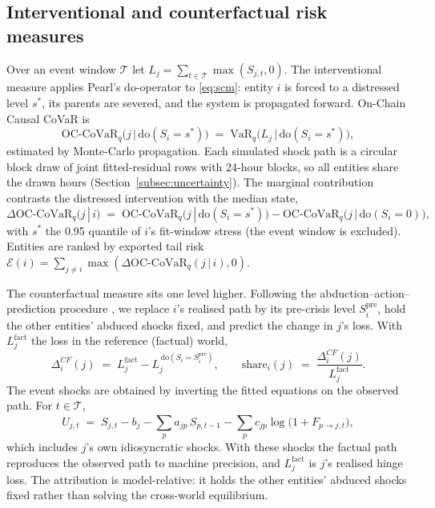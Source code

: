 \documentclass[referee,pdflatex,sn-mathphys-ay]{sn-jnl}
\theoremstyle{thmstyleone}%
\theoremstyle{thmstyletwo}%
\theoremstyle{thmstylethree}%
\newcommand{\doop}{\mathrm{do}}
\newcommand{\VaR}{\mathrm{VaR}}
\newcommand{\OCCoVaR}{\text{OC-CoVaR}}
\begin{document}
\subsection{Interventional and counterfactual risk measures}
\label{subsec:risk}
Over an event window $\mathcal{T}$ let $L_j=\sum_{t\in\mathcal{T}}\max(S_{j,t},0)$. The
interventional measure applies Pearl's do-operator to \eqref{eq:scm}: entity $i$ is forced
to a distressed level $s^\ast$, its parents are severed, and the system is propagated
forward. On-Chain Causal CoVaR is
\begin{equation}
\label{eq:occovar}
\OCCoVaR_q\big(j \,\big|\, \doop(S_i=s^\ast)\big)
   \;=\; \VaR_q\!\Big(L_j \,\Big|\, \doop(S_i=s^\ast)\Big),
\end{equation}
estimated by Monte-Carlo propagation. Each simulated shock path is a circular block draw of joint fitted-residual rows
with 24-hour blocks, so all entities share the drawn hours (Section~\ref{subsec:uncertainty}). The marginal
contribution contrasts the distressed intervention with the median state,
\begin{equation}
\label{eq:deltaoccovar}
\Delta\OCCoVaR_q(j\,|\,i) \;=\;
\OCCoVaR_q\big(j\,|\,\doop(S_i=s^\ast)\big) -
\OCCoVaR_q\big(j\,|\,\doop(S_i=0)\big),
\end{equation}
with $s^\ast$ the 0.95 quantile of $i$'s fit-window stress (the event window is excluded).
Entities are ranked by exported tail
risk $\mathcal{E}(i)=\sum_{j\ne i}\max(\Delta\OCCoVaR_q(j\,|\,i),0)$.

The counterfactual measure sits one level higher. Following the abduction--action--prediction
procedure \citep{pearl2009causality,pearl2019seven}, we replace $i$'s realised path by its
pre-crisis level $S_i^{\mathrm{pre}}$, hold the other entities' abduced shocks fixed, and
predict the change in $j$'s loss. With $L_j^{\mathrm{fact}}$ the loss in the reference
(factual) world,
\begin{equation}
\label{eq:cf}
\Delta_i^{CF}(j) \;=\; L_j^{\mathrm{fact}} - L_j^{\,\doop(S_i=S_i^{\text{pre}})},
\qquad
\text{share}_i(j) \;=\; \frac{\Delta_i^{CF}(j)}{L_j^{\mathrm{fact}}}.
\end{equation}
The event shocks are obtained by inverting the fitted equations on the observed path. For
$t\in\mathcal{T}$,
\begin{equation}
\label{eq:abduct}
\hat U_{j,t} \;=\; S_{j,t}-b_j-\sum_{p} a_{jp}\,S_{p,t-1}-\sum_{p} c_{jp}\log\!\big(1+F_{p\to j,t}\big),
\end{equation}
which includes $j$'s own idiosyncratic shocks. With these shocks the factual path reproduces the
observed path to machine precision, and $L_j^{\mathrm{fact}}$ is $j$'s realised hinge loss.
The attribution is model-relative: it holds the other entities' abduced shocks fixed rather than
solving the cross-world equilibrium.
\end{document}
